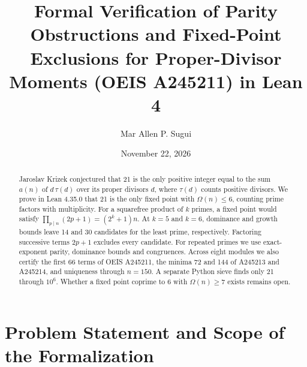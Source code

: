 \documentclass[11pt,reqno]{amsart}
\title[Proper-Divisor Moments (OEIS A245211) in Lean 4]{Formal Verification of Parity Obstructions and Fixed-Point Exclusions for Proper-Divisor Moments (OEIS A245211) in Lean 4}
\author[M.~A.~P.~Sugui]{Mar Allen P. Sugui}
\date{November 22, 2026}
\theoremstyle{plain}
\theoremstyle{definition}
\theoremstyle{remark}
\begin{document}
\begin{abstract}
Jaroslav Krizek conjectured that 21 is the only positive integer equal to the sum $a(n)$ of $d\,\tau(d)$ over its proper divisors $d$, where $\tau(d)$ counts positive divisors. We prove in Lean 4.35.0 that 21 is the only fixed point with $\Omega(n)\le 6$, counting prime factors with multiplicity. For a squarefree product of $k$ primes, a fixed point would satisfy $\prod_{p\mid n}(2p+1)=(2^k+1)n$. At $k=5$ and $k=6$, dominance and growth bounds leave 14 and 30 candidates for the least prime, respectively. Factoring successive terms $2p+1$ excludes every candidate. For repeated primes we use exact-exponent parity, dominance bounds and congruences. Across eight modules we also certify the first 66 terms of OEIS A245211, the minima 72 and 144 of A245213 and A245214, and uniqueness through $n=150$. A separate Python sieve finds only 21 through $10^6$. Whether a fixed point coprime to 6 with $\Omega(n)\ge 7$ exists remains open.
\end{abstract}

\maketitle

\section{Problem Statement and Scope of the Formalization}
\end{document}
